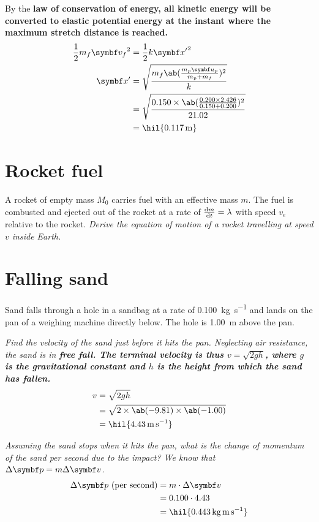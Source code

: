 By the \bf{law of conservation of energy}, all kinetic energy will be
converted to elastic potential energy at the instant where the
maximum stretch distance is reached.
\begin{align*}
  \frac{1}{2}m_f{\mv{v}_f}^2 &= \frac{1}{2}k{\mv{x}'}^2 \\
  \mv{x}' &= \sqrt{\f{m_f\ab(\f{m_p\mv{u}_p}{m_p + m_f})^2}{k}} \\
  &= \sqrt{\f{0.150\times \ab(\f{0.200\times 2.426}{0.150 +
  0.200})^2}{21.02}} \\
  &= \hil{\qty{0.117}{\metre}}
\end{align*}

\section{Rocket fuel}
A rocket of empty mass \(M_0\) carries fuel with an effective mass \(m\).
The fuel is combusted and ejected out of the rocket at a rate of
\(\odv{m}{t} = \lambda\)
with speed \(v_e\) relative to the rocket. \it{Derive the equation of
motion of a rocket travelling at speed \(v\) inside Earth.}

\section{Falling sand}
Sand falls through a hole in a sandbag at a rate of
\qty{0.100}{\kg\per\second} and lands
on the pan of a weighing machine directly below. The hole is
\qty{1.00}{\metre} above the pan.

\it{Find the velocity of the sand just before it hits the pan.}
Neglecting air resistance, the sand is in \bf{free fall}. The
\bf{terminal velocity} is thus
\(v = \sqrt{2gh}\), where \(g\) is the gravitational constant and
\(h\) is the height from which
the sand has fallen.
\begin{align*}
  v &= \sqrt{2 g h} \\
  &= \sqrt{2 \times \ab(-9.81) \times \ab(-1.00)} \\
  &= \hil{\qty{4.43}{\metre\per\second}}
\end{align*}

\it{Assuming the sand stops when it hits the pan, what is the change
of momentum of the sand per second due to the impact?}
We know that \(\Delta\mv{p} = m\Delta\mv{v}\).
\begin{align*}
  \Delta\mv{p} \text{ (per second)} &= m\cdot\Delta\mv{v} \\
  &= 0.100 \cdot 4.43 \\
  &= \hil{\qty{0.443}{\kg\metre\per\second}}
\end{align*}

